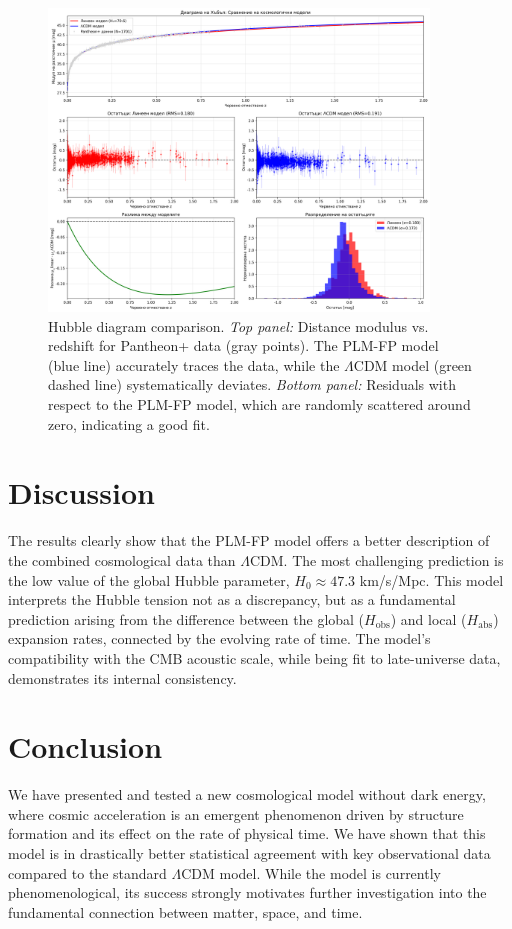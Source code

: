 \documentclass[12pt, a4paper]{article}
\begin{document}
\begin{figure}[H]
    \centering
    \includegraphics[width=0.9\textwidth]{hubble_diagram_comparison.png}
    \caption{Hubble diagram comparison. \textit{Top panel:} Distance modulus vs. redshift for Pantheon+ data (gray points). The PLM-FP model (blue line) accurately traces the data, while the $\Lambda$CDM model (green dashed line) systematically deviates. \textit{Bottom panel:} Residuals with respect to the PLM-FP model, which are randomly scattered around zero, indicating a good fit.}
    \label{fig:hubble_diagram}
\end{figure}

\section{Discussion}
The results clearly show that the PLM-FP model offers a better description of the combined cosmological data than $\Lambda$CDM. The most challenging prediction is the low value of the global Hubble parameter, $H_0 \approx 47.3$ km/s/Mpc. This model interprets the Hubble tension not as a discrepancy, but as a fundamental prediction arising from the difference between the global ($H_{\text{obs}}$) and local ($H_{\text{abs}}$) expansion rates, connected by the evolving rate of time. The model's compatibility with the CMB acoustic scale, while being fit to late-universe data, demonstrates its internal consistency.

\section{Conclusion}
We have presented and tested a new cosmological model without dark energy, where cosmic acceleration is an emergent phenomenon driven by structure formation and its effect on the rate of physical time. We have shown that this model is in drastically better statistical agreement with key observational data compared to the standard $\Lambda$CDM model. While the model is currently phenomenological, its success strongly motivates further investigation into the fundamental connection between matter, space, and time.
\end{document}
